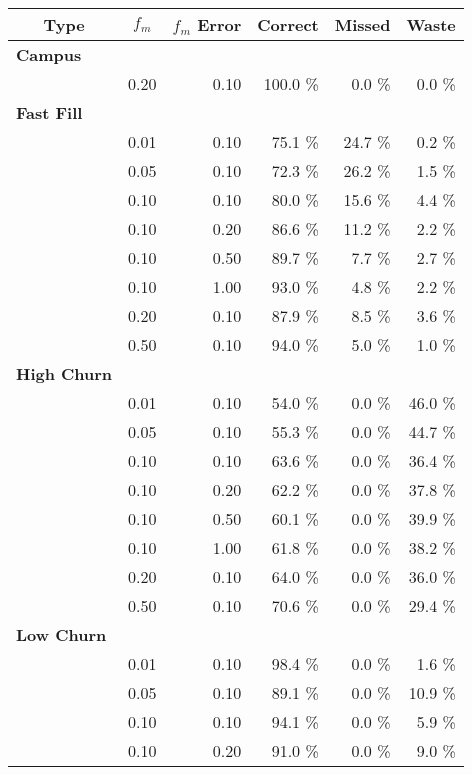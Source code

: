 \begin{table}[t]
\begin{threeparttable}
{\small
\begin{tabularx}{\columnwidth}{Xrrrrr}
\multicolumn{1}{c}{\textbf{Type}} & 
\multicolumn{1}{c}{\textbf{$f_m$}} & 
\multicolumn{1}{c}{\textbf{$f_m$ Error}} & 
\multicolumn{1}{c}{\textbf{Correct}} & 
\multicolumn{1}{c}{\textbf{Missed}} & 
\multicolumn{1}{c}{\textbf{Waste}}\\ \toprule

\textbf{Campus} & & & & & \\
\midrule
& 0.20 & 0.10 & 100.0 \% & 0.0 \% & 0.0 \% \\
\textbf{Fast Fill} & & & & & \\
\midrule
& 0.01 & 0.10 & 75.1 \% & 24.7 \% & 0.2 \% \\
& 0.05 & 0.10 & 72.3 \% & 26.2 \% & 1.5 \% \\
& 0.10 & 0.10 & 80.0 \% & 15.6 \% & 4.4 \% \\
& 0.10 & 0.20 & 86.6 \% & 11.2 \% & 2.2 \% \\
& 0.10 & 0.50 & 89.7 \% & 7.7 \% & 2.7 \% \\
& 0.10 & 1.00 & 93.0 \% & 4.8 \% & 2.2 \% \\
& 0.20 & 0.10 & 87.9 \% & 8.5 \% & 3.6 \% \\
& 0.50 & 0.10 & 94.0 \% & 5.0 \% & 1.0 \% \\
\textbf{High Churn} & & & & & \\
\midrule
& 0.01 & 0.10 & 54.0 \% & 0.0 \% & 46.0 \% \\
& 0.05 & 0.10 & 55.3 \% & 0.0 \% & 44.7 \% \\
& 0.10 & 0.10 & 63.6 \% & 0.0 \% & 36.4 \% \\
& 0.10 & 0.20 & 62.2 \% & 0.0 \% & 37.8 \% \\
& 0.10 & 0.50 & 60.1 \% & 0.0 \% & 39.9 \% \\
& 0.10 & 1.00 & 61.8 \% & 0.0 \% & 38.2 \% \\
& 0.20 & 0.10 & 64.0 \% & 0.0 \% & 36.0 \% \\
& 0.50 & 0.10 & 70.6 \% & 0.0 \% & 29.4 \% \\
\textbf{Low Churn} & & & & & \\
\midrule
& 0.01 & 0.10 & 98.4 \% & 0.0 \% & 1.6 \% \\
& 0.05 & 0.10 & 89.1 \% & 0.0 \% & 10.9 \% \\
& 0.10 & 0.10 & 94.1 \% & 0.0 \% & 5.9 \% \\
& 0.10 & 0.20 & 91.0 \% & 0.0 \% & 9.0 \% \\

\end{tabularx}}
\end{threeparttable}
\end{table}
